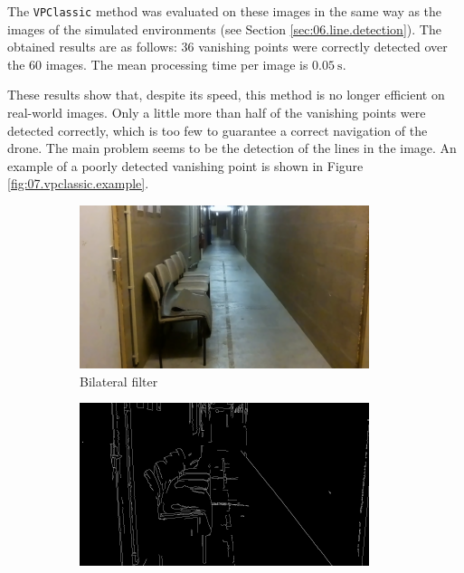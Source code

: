 The \texttt{VPClassic} method was evaluated on these images in the same way as the images of the simulated environments (see Section \ref{sec:06.line.detection}). The obtained results are as follows: $\num{36}$ vanishing points were correctly detected over the $\num{60}$ images. The mean processing time per image is $\SI{0.05}{\second}$.

These results show that, despite its speed, this method is no longer efficient on real-world images. Only a little more than half of the vanishing points were detected correctly, which is too few to guarantee a correct navigation of the drone. The main problem seems to be the detection of the lines in the image. An example of a poorly detected vanishing point is shown in Figure \ref{fig:07.vpclassic.example}.

\begin{figure}[t]
    \centering
    \begin{subfigure}{0.49\textwidth}
        \centering
        \includegraphics[width=\textwidth]{resources/png/07/vanishing-point/vpclassic/0.png}
        \caption{Bilateral filter}
        \vspace{0.5em}
    \end{subfigure}
    \hfill
    \begin{subfigure}{0.49\textwidth}
        \centering
        \includegraphics[width=\textwidth]{resources/png/07/vanishing-point/vpclassic/1.png}

\end{subfigure}
\end{figure}
